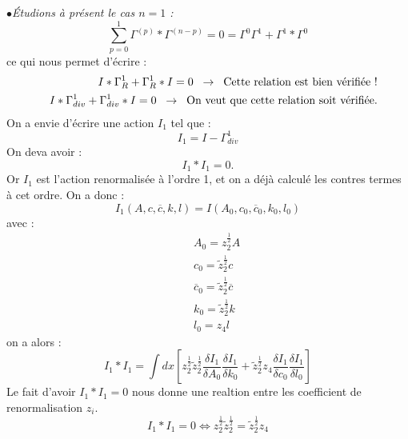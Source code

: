\documentclass[a4paper,11pt]{article}
\theoremstyle{plain}
\theoremstyle{definition}
\theoremstyle{remark}
\numberwithin{equation}{section}
\numberwithin{equation}{subsection}
\numberwithin{figure}{section}
\begin{document}
\noindent
$\bullet$\textit{Étudions à présent le cas $n=1$ :}
\begin{equation}
 \sum_{p=0}^{1} \Gamma^{(p)} * \Gamma^{(n-p)} = 0 = \Gamma^{0} \Gamma^{1} + \Gamma^{1} * \Gamma^{0}
\end{equation}
ce qui nous permet d'écrire :
\begin{eqnarray*}
 && I * \Gamma^{1}_{R} + \Gamma^{1}_{R} * I = 0 \hspace{2mm} \rightarrow \hspace{2mm} \text{Cette relation est bien vérifiée !} \\
 && I * \Gamma^{1}_{div} + \Gamma^{1}_{div} * I = 0 \hspace{2mm} \rightarrow \hspace{2mm} \text{On veut que cette relation soit 
vérifiée.}
\end{eqnarray*}
On a envie d'écrire une action $I_{1}$ tel que :
\begin{equation}
I_{1} = I - \Gamma^{1}_ {div}
\end{equation}
On deva avoir :
\begin{equation}
 I_{1} * I_{1} = 0.
\end{equation}
Or $I_{1}$ est l'action renormalisée à l'ordre 1, et on a déjà calculé les contres termes à cet ordre. On a donc :
\begin{equation}
 I_{1} \left( A, c, \overline{c}, k, l \right) = I \left( A_{0}, c_{0}, \overline{c}_{0}, k_{0}, l_{0} \right)
\end{equation}
avec :
\begin{eqnarray}
 && A_{0} = z_{2}^{\frac{1}{2}} A  \\
 && c_{0} = \tilde{z}_{2}^{\frac{1}{2}} c  \\
 && \overline{c}_{0} = \tilde{z}_{2}^{\frac{1}{2}} \overline{c} \\
 && k_{0} = \tilde{z}_{2}^{\frac{1}{2}} k \\
 && l_{0} = z_{4} l
\end{eqnarray}
on a alors :
\begin{equation}
 I_{1} * I_{1} = \int dx \left[ z_{2}^{\frac{1}{2}} \tilde{z}_{2}^{\frac{1}{2}} \frac{\delta I_{1}}{\delta A_{0}} \frac{\delta I_{1}}{\delta k_{0}}
+ \tilde{z}_{2}^{\frac{1}{2}} z_{4} \frac{\delta I_{1}}{\delta c_{0}}\frac{\delta I_{1}}{\delta l_{0}} \right]
\end{equation}
Le fait d'avoir $I_{1} * I_{1} = 0$ nous donne une realtion entre les coefficient de renormalisation $z_{i}$.
\begin{equation}
 I_{1} * I_{1} = 0 \Leftrightarrow z_{2}^{\frac{1}{2}} \tilde{z}_{2}^{\frac{1}{2}} = \tilde{z}_{2}^{\frac{1}{2}} z_{4}
\end{equation}
\end{document}
